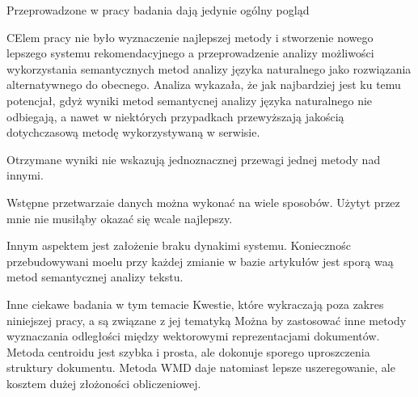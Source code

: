 \documentclass[pl]{minipw} %
\begin{document}

Przeprowadzone w pracy badania dają jedynie ogólny pogląd

CElem pracy nie było wyznaczenie najlepszej metody i stworzenie nowego lepszego systemu rekomendacyjnego a przeprowadzenie analizy możliwości wykorzystania semantycznych metod analizy języka naturalnego jako rozwiązania alternatywnego do obecnego. Analiza wykazała, że jak najbardziej jest ku temu potencjał, gdyż wyniki metod semantycnej analizy języka naturalnego nie odbiegają, a nawet w niektórych przypadkach przewyższają jakością dotychczasową metodę wykorzystywaną w serwisie.

Otrzymane wyniki nie wskazują jednoznacznej przewagi jednej metody nad innymi.

Wstępne przetwarzaie danych można wykonać na wiele sposobów. Użytyt przez mnie nie musiłąby okazać się wcale najlepszy.

Innym aspektem jest założenie braku dynakimi systemu. Koniecznośc przebudowywani moelu przy każdej zmianie w bazie artykułów jest sporą waą metod semantycznej analizy tekstu.

Inne ciekawe badania w tym temacie
Kwestie, które wykraczają poza zakres niniejszej pracy, a są związane z jej tematyką
Można by zastosować inne metody wyznaczania odległości między wektorowymi reprezentacjami dokumentów. Metoda centroidu jest szybka i prosta, ale dokonuje sporego uproszczenia struktury dokumentu. Metoda WMD daje natomiast lepsze uszeregowanie, ale kosztem dużej złożoności obliczeniowej.
\end{document}
